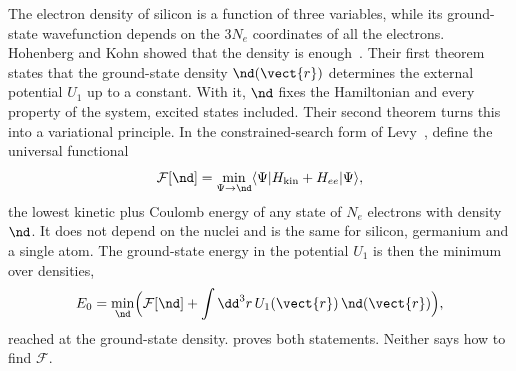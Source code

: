 The electron density of silicon is a function of three variables, while its ground-state wavefunction depends on the $3N_e$ coordinates of all the electrons. Hohenberg and Kohn showed that the density is enough~\cite{hohenberg1964inhomogeneous}. Their first theorem states that the ground-state density $\nd(\vect{r})$ determines the external potential $U_1$ up to a constant. With it, $\nd$ fixes the Hamiltonian and every property of the system, excited states included. Their second theorem turns this into a variational principle. In the constrained-search form of Levy~\cite{levy1979universal}, define the universal functional
\begin{equation*}
  \mathcal{F}[\nd] = \min_{\Psi\to\nd}\langle\Psi|H_{\mathrm{kin}} + H_{ee}|\Psi\rangle ,
\end{equation*}
the lowest kinetic plus Coulomb energy of any state of $N_e$ electrons with density $\nd$. It does not depend on the nuclei and is the same for silicon, germanium and a single atom. The ground-state energy in the potential $U_1$ is then the minimum over densities,
\begin{equation}
  E_0 = \min_{\nd}\Bigl(\mathcal{F}[\nd] + \int\dd^3r\,U_1(\vect{r})\,\nd(\vect{r})\Bigr),
  \label{eq:3.4-HK}
\end{equation}
reached at the ground-state density.  proves both statements. Neither says how to find $\mathcal{F}$.

